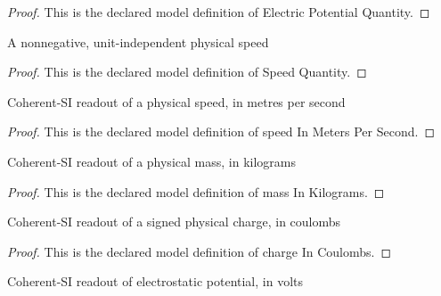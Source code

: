 \begin{proof}
  This is the declared model definition of Electric Potential Quantity.
\end{proof}
\begin{definition}
  \label{def:physics:phyx-mini-0865:phyxminiproblems-problemphyxmini0865-speedquantity}
  A nonnegative, unit-independent physical speed
\end{definition}
\begin{proof}
  This is the declared model definition of Speed Quantity.
\end{proof}
\begin{definition}
  \label{def:physics:phyx-mini-0865:phyxminiproblems-problemphyxmini0865-speedinmeterspersecond}
  Coherent-SI readout of a physical speed, in metres per second
\end{definition}
\begin{proof}
  This is the declared model definition of speed In Meters Per Second.
\end{proof}
\begin{definition}
  \label{def:physics:phyx-mini-0865:phyxminiproblems-problemphyxmini0865-massinkilograms}
  Coherent-SI readout of a physical mass, in kilograms
\end{definition}
\begin{proof}
  This is the declared model definition of mass In Kilograms.
\end{proof}
\begin{definition}
  \label{def:physics:phyx-mini-0865:phyxminiproblems-problemphyxmini0865-chargeincoulombs}
  Coherent-SI readout of a signed physical charge, in coulombs
\end{definition}
\begin{proof}
  This is the declared model definition of charge In Coulombs.
\end{proof}
\begin{definition}
  \label{def:physics:phyx-mini-0865:phyxminiproblems-problemphyxmini0865-potentialinvolts}
  Coherent-SI readout of electrostatic potential, in volts
\end{definition}
